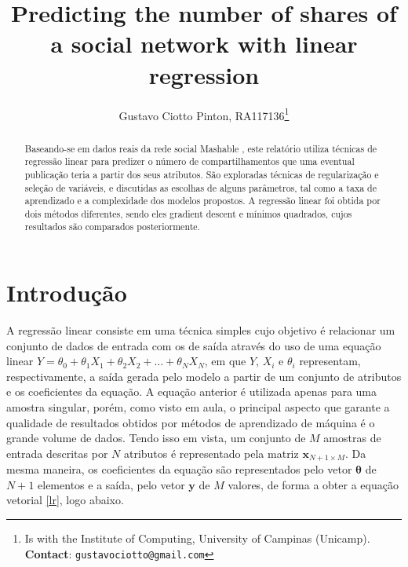 \documentclass[10pt,twocolumn,letterpaper]{article}
\begin{document}
\title {Predicting the number of shares of a social network with linear regression }
\author{Gustavo Ciotto Pinton, RA117136\thanks{Is with the Institute of Computing, University of Campinas (Unicamp). \textbf{Contact}: \tt\small{gustavociotto@gmail.com}}}

\maketitle
\begin{abstract}
Baseando-se em dados reais da rede social Mashable \cite{database}, este relatório utiliza técnicas de regressão linear para predizer o número de compartilhamentos que uma eventual publicação teria a partir dos seus atributos. São exploradas técnicas de regularização e seleção de variáveis, e discutidas as escolhas de alguns parâmetros, tal como a taxa de aprendizado e a complexidade dos modelos propostos. A regressão linear foi obtida por dois métodos diferentes, sendo eles gradient descent e mínimos quadrados, cujos resultados são comparados posteriormente.
\end{abstract}

\section{Introdução}
\label{intro}

A regressão linear consiste em uma técnica simples cujo objetivo é relacionar um conjunto de dados de entrada com os de saída através do uso de uma equação linear \(Y = \theta_0 + \theta_1X_1 + \theta_2X_2 + \ldots + \theta_NX_N\), em que \(Y\), \(X_i\) e \(\theta_i\) representam, respectivamente, a saída gerada pelo modelo a partir de um conjunto de atributos e os coeficientes da equação. A equação anterior é utilizada apenas para uma amostra singular, porém, como visto em aula, o principal aspecto que garante a qualidade de resultados obtidos por métodos de aprendizado de máquina é o grande volume de dados. Tendo isso em vista, um conjunto de \(M\) amostras de entrada descritas por \(N\) atributos é representado pela matriz \(\bm{x}_{N+1\times M}\). Da mesma maneira, os coeficientes da equação são representados pelo vetor \(\bm{\theta}\) de \(N+1\) elementos e a saída, pelo vetor \(\bm{y}\) de \(M\) valores, de forma a obter a equação vetorial \ref{lr}, logo abaixo.
\end{document}
